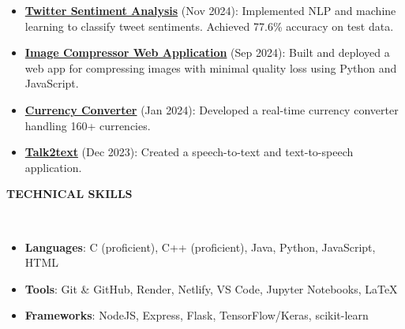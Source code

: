 \documentclass[a4paper,10pt]{article}
\newcommand{\lsep}{-0.5cm}
\newcommand{\resheading}[1]{{\small \colorbox{mygrey}{\begin{minipage}{0.975\textwidth}{\textbf{#1 \vphantom{p\^{E}}}}\end{minipage}}}}
\begin{document}
\begin{itemize}
\begin{itemize}
\item \textbf{\href{https://github.com/VinodPandey14/Twitter-Sentiment-Analysis}{Twitter Sentiment Analysis}} (Nov 2024):  Implemented NLP and machine learning to classify tweet sentiments. Achieved 77.6\% accuracy on test data.

\item \textbf{\href{https://compress-img.netlify.app/}{Image Compressor Web Application}} (Sep 2024): Built and deployed a web app for compressing images with minimal quality loss using Python and JavaScript.

\item \textbf{\href{https://currency-converter-vp.netlify.app/}{Currency Converter}} (Jan 2024): Developed a real-time currency converter handling 160+ currencies.

\item \textbf{\href{https://talk2text.netlify.app/}{Talk2text}} (Dec 2023): Created a speech-to-text and text-to-speech application.
\end{itemize}

\resheading{\textbf{TECHNICAL SKILLS} }\\[\lsep]
\begin{itemize}
\setlength\itemsep{0em}
\item \noindent \textbf{Languages}: C (proficient), C++ (proficient), Java, Python, JavaScript, HTML\\
\item \noindent \textbf{Tools}: Git \& GitHub, Render, Netlify, VS Code, Jupyter Notebooks, \LaTeX\\
\item \noindent \textbf{Frameworks}: NodeJS, Express, Flask, TensorFlow/Keras, scikit-learn
\end{itemize}


\end{itemize}
\end{document}
